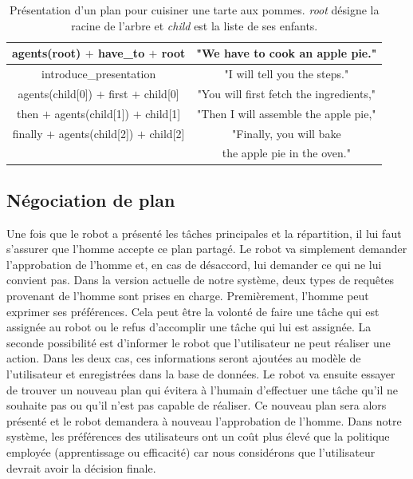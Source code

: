 \documentclass[a4paper,11pt,twoside]{StyleThese}
\begin{document}
 
 \begin{table}
\centering
\scriptsize
\renewcommand{\arraystretch}{1.3}
\begin{tabular}{|c|c|}
\hline
   agents(root) $+$ have\_to $+$ root  & "We have to cook an apple pie." \\
   \hline
   introduce\_presentation & "I will tell you the steps." \\
   \hline
   agents(child[0]) $+$ first $+$ child[0] & "You will first fetch the ingredients," \\
   \hline
   then $+$ agents(child[1]) $+$  child[1] & "Then I will assemble the apple pie," \\
   \hline
   finally $+$ agents(child[2]) $+$  child[2] & "Finally, you will bake \\
   & the apple pie in the oven." \\
   \hline
\end{tabular}
\caption{Présentation d'un plan pour cuisiner une tarte aux pommes. \textit{root} désigne la racine de l'arbre et \textit{child} est la liste de ses enfants.}
 \label{table:pie-present}    
\end{table}
 

\subsection{Négociation de plan}
\label{sec:planNego}
Une fois que le robot a présenté les tâches principales et la répartition, il lui faut s'assurer que l'homme accepte ce plan partagé. Le robot va simplement demander l'approbation de l'homme et, en cas de désaccord, lui demander ce qui ne lui convient pas.
Dans la version actuelle de notre système, deux types de requêtes provenant de l'homme sont prises en charge. Premièrement, l'homme peut exprimer ses préférences. Cela peut être la volonté de faire une tâche qui est assignée au robot ou le refus d'accomplir une tâche qui lui est assignée. La seconde possibilité est d'informer le robot que l'utilisateur ne peut réaliser une action. Dans les deux cas, ces informations seront ajoutées au modèle de l'utilisateur et enregistrées dans la base de données. Le robot va ensuite essayer de trouver un nouveau plan qui évitera à l'humain d'effectuer une tâche qu'il ne souhaite pas ou qu'il n'est pas capable de réaliser. Ce nouveau plan sera alors présenté et le robot demandera à nouveau l'approbation de l'homme. Dans notre système, les préférences des utilisateurs ont un coût plus élevé que la politique employée (apprentissage ou efficacité) car nous considérons que l'utilisateur devrait avoir la décision finale.
\end{document}

